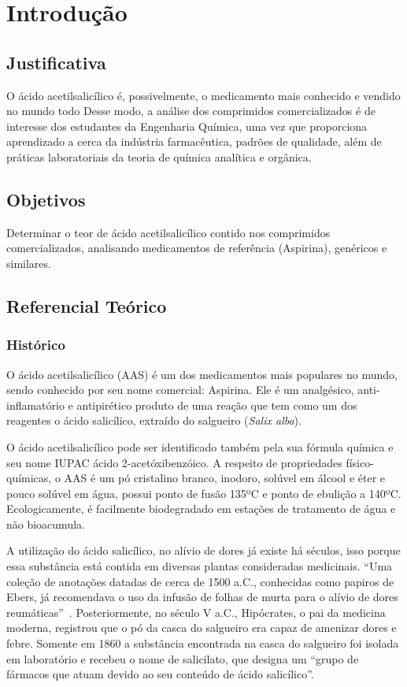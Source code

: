 \chapter{Introdução}\label{intro}
\section{Justificativa}\label{sub:just}    

O ácido acetilsalicílico é, possivelmente, o medicamento mais conhecido e vendido no mundo todo
Desse modo, a análise dos comprimidos comercializados é de interesse dos estudantes da Engenharia Química,
uma vez que proporciona aprendizado a cerca da indústria farmacêutica, padrões de qualidade, além de
práticas laboratoriais da teoria de química analítica e orgânica.

\section{Objetivos}\label{sub:Objetivos}
Determinar o teor de ácido acetilsalicílico contido nos comprimidos comercializados, analisando
medicamentos de referência (Aspirina\R), genéricos e similares.

\section{Referencial Teórico}\label{sub:reft}

\subsection{Histórico}\label{sub:Histórico}

O ácido acetilsalicílico (AAS) é um dos medicamentos mais populares no mundo, sendo conhecido por
seu nome comercial: Aspirina\R. Ele é um analgésico, anti-inflamatório e antipirético produto de uma
reação que tem como um dos reagentes o ácido salicílico, extraído do salgueiro (\textit{Salix
alba}).  

O ácido acetilsalicílico pode ser identificado também pela sua fórmula química  e seu
nome IUPAC ácido 2-acetóxibenzóico. A respeito de propriedades físico-químicas, o AAS é um pó
cristalino branco, inodoro, solúvel em álcool e éter e pouco solúvel em água, possui ponto de fusão
135ºC e ponto de ebulição a 140ºC. Ecologicamente, é facilmente biodegradado em estações de
tratamento de água e não bioacumula.~\cite{teves}

A utilização do ácido salicílico, no alívio de dores já existe há séculos, isso porque essa
substância está contida em diversas plantas consideradas medicinais. “Uma coleção de anotações
datadas de cerca de 1500 a.C., conhecidas como papiros de Ebers, já recomendava o uso da infusão de
folhas de murta para o alívio de dores reumáticas”~\cite{aspirinabayer}. Posteriormente, no século V
a.C., Hipócrates, o pai da medicina moderna, registrou que o pó da casca do salgueiro era capaz de
amenizar dores e febre. Somente em 1860 a substância encontrada na casca do salgueiro foi isolada em
laboratório e recebeu o nome de salicilato, que designa um “grupo de fármacos que atuam devido ao
seu conteúdo de ácido salicílico”.~\cite{Goodman2005}

